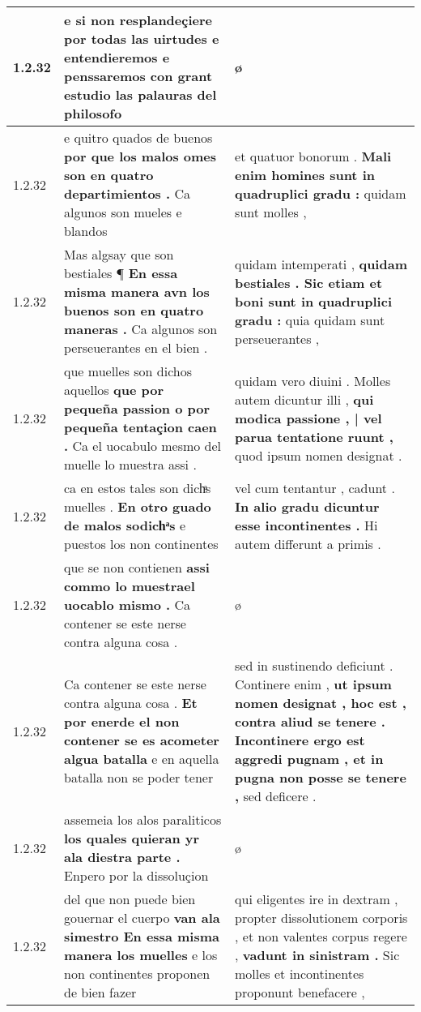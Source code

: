 \begin{tabular}{|p{1cm}|p{6.5cm}|p{6.5cm}|}
1.2.32 & e si non resplandeçiere por todas las uirtudes \textbf{ e entendieremos e penssaremos con grant estudio } las palauras del philosofo & ø \\\hline
1.2.32 & e quitro quados de buenos \textbf{ por que los malos omes son en quatro departimientos . } Ca algunos son mueles e blandos & et quatuor bonorum . \textbf{ Mali enim homines sunt in quadruplici gradu : } quidam sunt molles , \\\hline
1.2.32 & Mas algsay que son bestiales ¶ \textbf{ En essa misma manera avn los buenos son en quatro maneras . } Ca algunos son perseuerantes en el bien . & quidam intemperati , \textbf{ quidam bestiales . Sic etiam et boni sunt in quadruplici gradu : } quia quidam sunt perseuerantes , \\\hline
1.2.32 & que muelles son dichos aquellos \textbf{ que por pequeña passion o por pequeña tentaçion caen . } Ca el uocabulo mesmo del muelle lo muestra assi . & quidam vero diuini . Molles autem dicuntur illi , \textbf{ qui modica passione , | vel parua tentatione ruunt , } quod ipsum nomen designat . \\\hline
1.2.32 & ca en estos tales son dichͣs muelles . \textbf{ En otro guado de malos sodichͣs } e puestos los non continentes & vel cum tentantur , cadunt . \textbf{ In alio gradu dicuntur esse incontinentes . } Hi autem differunt a primis . \\\hline
1.2.32 & que se non contienen \textbf{ assi commo lo muestrael uocablo mismo . } Ca contener se este nerse contra alguna cosa . & ø \\\hline
1.2.32 & Ca contener se este nerse contra alguna cosa . \textbf{ Et por enerde el non contener se es acometer algua batalla } e en aquella batalla non se poder tener & sed in sustinendo deficiunt . Continere enim , \textbf{ ut ipsum nomen designat , hoc est , contra aliud se tenere . Incontinere ergo est aggredi pugnam , et in pugna non posse se tenere , } sed deficere . \\\hline
1.2.32 & assemeia los alos paraliticos \textbf{ los quales quieran yr ala diestra parte . } Enpero por la dissoluçion & ø \\\hline
1.2.32 & del que non puede bien gouernar el cuerpo \textbf{ van ala simestro En essa misma manera los muelles } e los non continentes proponen de bien fazer & qui eligentes ire in dextram , propter dissolutionem corporis , et non valentes corpus regere , \textbf{ vadunt in sinistram . } Sic molles et incontinentes proponunt benefacere , \\\hline

\end{tabular}
